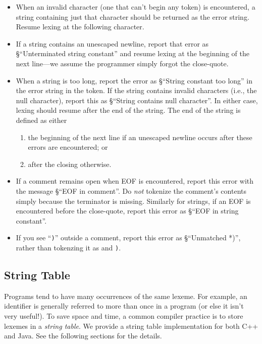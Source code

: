 \documentclass[11pt]{article}
\begin{document}
\begin{itemize}

  \item When an invalid character (one that can't begin any token) is
  encountered, a string containing just that character should be
  returned as the error string.  Resume lexing at the following character.

  \item If a string contains an unescaped newline, report that error as
  \S{``Unterminated string constant''} and resume lexing at the
  beginning of the next line---we assume the programmer simply
  forgot the close-quote.

  \item When a string is too long, report the error as \S{``String
        constant too long''} in the error string in the 
        token.  If the string contains invalid
        characters (i.e., the null character), report this as
        \S{``String contains null character''}.  In either case,
        lexing should resume after the end of the string.  The
        end of the string is defined as either
        \begin{enumerate}
          \item the beginning of the next line if an unescaped
                newline occurs after these errors are encountered; or
          \item after the closing  otherwise.
        \end{enumerate}


  \item If a comment remains open when EOF is encountered, report this
  error with the message \S{``EOF in comment''}.  Do \emph{not} tokenize the
  comment's contents simply because the terminator is missing.
  Similarly for strings, if an EOF is encountered before the
  close-quote, report this error as \S{``EOF in string constant''}.

  \item If you see ``{\tt *)}'' outside a comment, report this error as
  \S{``Unmatched *)''}, rather than tokenzing it as {\tt *}
  and {\tt )}.


\end{itemize}


\subsection{String Table}

Programs tend to have many occurrences of the same lexeme.  For example,
an identifier is generally referred to more than once in a program (or
else it isn't very useful!).  To save space and time, a common compiler
practice is to store lexemes in a {\em string table}.  We provide a
string table implementation for both C++ and Java.  See the following
sections for the details.
\end{document}
